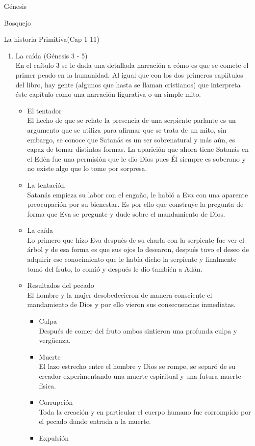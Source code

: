 \begin{section}{Génesis}
\begin{subsection}{Bosquejo}
\begin{subsubsection}{La historia Primitiva(Cap 1-11)}
\begin{enumerate}
\item La caída (Génesis 3 - 5)\\
	En el caítulo 3 se le dada una detallada narración a cómo es que se comete el primer peado en la humanidad. Al igual que con los dos primeros capiítulos del libro, hay gente (algunos que hasta se llaman cristianos) que interpreta éste capítulo como una narración figurativa o un simple mito.
	\begin{itemize}
		\item El tentador\\
			El hecho de que se relate la presencia de una serpiente parlante es un argumento que se utiliza para afirmar que se trata de un mito, sin embargo, se conoce que Satanás es un ser sobrenatural y más aún, es capaz de tomar distintas formas. La aparición que ahora tiene Satanás en el Edén fue una permisión que le dio Dios pues Él siempre es soberano y no existe algo que lo tome por sorpresa.
		\item La tentación\\
			Satanás empieza su labor con el engaño, le habló a Eva con una aparente preocupación por su bienestar. Es por ello que construye la pregunta de forma que Eva se pregunte y dude sobre el mandamiento de Dios.
		\item La caída\\
			Lo primero que hizo Eva después de su charla con la serpiente fue ver el árbol y de esa forma es que sus ojos lo desearon, después tuvo el deseo de adquirir ese conocimiento que le había dicho la serpiente y finalmente tomó del fruto, lo comió y después le dio también a Adán.
		\item Resultados del pecado\\
			El hombre y la mujer desobedecieron de manera consciente el mandamiento de Dios y por ello vieron sus consecuencias inmediatas. 
			\begin{itemize}
				\item Culpa\\
					Después de comer del fruto ambos sintieron una profunda culpa y vergüenza.
				\item Muerte\\
					El lazo estrecho entre el hombre y Dios se rompe, se separó de su creador experimentando una muerte espiritual y una futura muerte física.
				\item Corrupción\\
					Toda la creación y en particular el cuerpo humano fue corrompido por el pecado dando entrada a la muerte.
				\item Expulsión\\

\end{itemize}
\end{itemize}
\end{enumerate}
\end{subsubsection}
\end{subsection}
\end{section}
